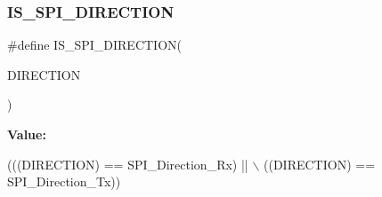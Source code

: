 \subsubsection{\texorpdfstring{I\+S\+\_\+\+S\+P\+I\+\_\+\+D\+I\+R\+E\+C\+T\+I\+ON}{IS\_SPI\_DIRECTION}}
{\footnotesize\ttfamily \#define I\+S\+\_\+\+S\+P\+I\+\_\+\+D\+I\+R\+E\+C\+T\+I\+ON(\begin{DoxyParamCaption}\item[{}]{D\+I\+R\+E\+C\+T\+I\+ON }\end{DoxyParamCaption})}

{\bfseries Value\+:}
\begin{DoxyCode}
(((DIRECTION) == SPI\_Direction\_Rx) || \(\backslash\)
                                     ((DIRECTION) == SPI\_Direction\_Tx))
\end{DoxyCode}
